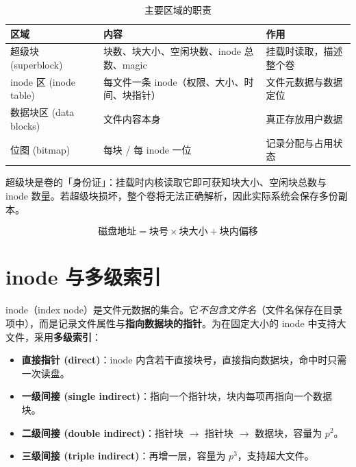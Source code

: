 \begin{table}[H]
\centering
\caption{主要区域的职责}
\begin{tabulary}{\textwidth}{LLL}
\toprule
区域 & 内容 & 作用 \\
\midrule
超级块 (superblock) & 块数、块大小、空闲块数、inode 总数、magic & 挂载时读取，描述整个卷 \\
inode 区 (inode table) & 每文件一条 inode（权限、大小、时间、块指针） & 文件元数据与数据定位 \\
数据块区 (data blocks) & 文件内容本身 & 真正存放用户数据 \\
位图 (bitmap) & 每块 / 每 inode 一位 & 记录分配与占用状态 \\
\bottomrule
\end{tabulary}
\end{table}

超级块是卷的「身份证」：挂载时内核读取它即可获知块大小、空闲块总数与 inode 数量。若超级块损坏，整个卷将无法正确解析，因此实际系统会保存多份副本。

\begin{equation}
    \text{磁盘地址} = \text{块号} \times \text{块大小} + \text{块内偏移}
\end{equation}

\section{inode 与多级索引}

inode（index node）是文件元数据的集合。它\emph{不包含文件名}（文件名保存在目录项中），而是记录文件属性与\textbf{指向数据块的指针}。为在固定大小的 inode 中支持大文件，采用\textbf{多级索引}：

\begin{itemize}
    \item \textbf{直接指针 (direct)}：inode 内含若干直接块号，直接指向数据块，命中时只需一次读盘。
    \item \textbf{一级间接 (single indirect)}：指向一个指针块，块内每项再指向一个数据块。
    \item \textbf{二级间接 (double indirect)}：指针块 $\to$ 指针块 $\to$ 数据块，容量为 $p^{2}$。
    \item \textbf{三级间接 (triple indirect)}：再增一层，容量为 $p^{3}$，支持超大文件。
\end{itemize}


